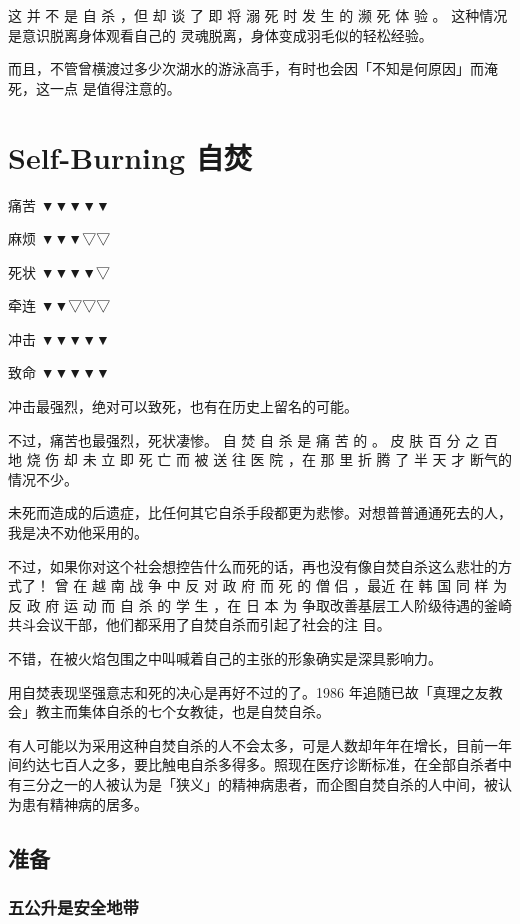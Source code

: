 \documentclass[UTF8]{ctexart}
\begin{document}
这 并 不 是 自 杀 ，但 却 谈 了 即 将 溺 死 时 发 生 的 濒 死 体 验 。
这种情况是意识脱离身体观看自己的 灵魂脱离，身体变成羽毛似的轻松经验。

而且，不管曾横渡过多少次湖水的游泳高手，有时也会因「不知是何原因」而淹死，这一点
是值得注意的。


\newpage

\section{Self-Burning 自焚}

痛苦 ▼▼▼▼▼

麻烦 ▼▼▼▽▽

死状 ▼▼▼▼▽

牵连 ▼▼▽▽▽

冲击 ▼▼▼▼▼

致命 ▼▼▼▼▼

冲击最强烈，绝对可以致死，也有在历史上留名的可能。

不过，痛苦也最强烈，死状凄惨。
自 焚 自 杀 是 痛 苦 的 。
皮 肤 百 分 之 百 地 烧 伤 却 未 立 即 死 亡 而 被 送 往 医 院 ，在 那 里 折 腾 了 半 天 才 断气的情况不少。

未死而造成的后遗症，比任何其它自杀手段都更为悲惨。对想普普通通死去的人，我是决不劝他采用的。

不过，如果你对这个社会想控告什么而死的话，再也没有像自焚自杀这么悲壮的方式了！
曾 在 越 南 战 争 中 反 对 政 府 而 死 的 僧 侣 ，最近 在 韩 国 同 样 为 反 政 府 运 动 而 自 杀 的 学 生 ，在 日 本 为 争取改善基层工人阶级待遇的釜崎共斗会议干部，他们都采用了自焚自杀而引起了社会的注 目。

不错，在被火焰包围之中叫喊着自己的主张的形象确实是深具影响力。

用自焚表现坚强意志和死的决心是再好不过的了。1986 年追随已故「真理之友教会」教主而集体自杀的七个女教徒，也是自焚自杀。

有人可能以为采用这种自焚自杀的人不会太多，可是人数却年年在增长，目前一年间约达七百人之多，要比触电自杀多得多。照现在医疗诊断标准，在全部自杀者中有三分之一的人被认为是「狭义」的精神病患者，而企图自焚自杀的人中间，被认为患有精神病的居多。

\subsection{准备}

\subsubsection*{五公升是安全地带}
\end{document}
